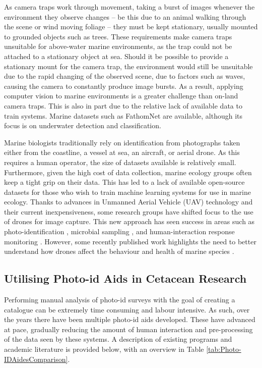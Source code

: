 As camera traps work through movement, taking a burst of images whenever the environment they observe changes -- be this due to an animal walking through the scene or wind moving foliage -- they must be kept stationary, usually mounted to grounded objects such as trees. These requirements make camera traps unsuitable for above-water marine environments, as the trap could not be attached to a stationary object at sea. Should it be possible to provide a stationary mount for the camera trap, the environment would still be unsuitable due to the rapid changing of the observed scene, due to factors such as waves, causing the camera to constantly produce image bursts. As a result, applying computer vision to marine environments is a greater challenge than on-land camera traps. This is also in part due to the relative lack of available data to train systems. Marine datasets such as FathomNet \cite{katija_fathomnet_2022} are available, although its focus is on underwater detection and classification.

Marine biologists traditionally rely on identification from photographs taken either from the coastline, a vessel at sea, an aircraft, or aerial drone. As this requires a human operator, the size of datasets available is relatively small. Furthermore, given the high cost of data collection, marine ecology groups often keep a tight grip on their data. This has led to a lack of available open-source datasets for those who wish to train machine learning systems for use in marine ecology. Thanks to advances in Unmanned Aerial Vehicle (UAV) technology and their current inexpensiveness, some research groups have shifted focus to the use of drones for image capture. This new approach has seen success in areas such as photo-identification \cite{bogucki_applying_2019, gray_drones_2019}, microbial sampling \cite{centelleghe_use_2020}, and human-interaction response monitoring \cite{fiori_using_2020}. However, some recently published work highlights the need to better understand how drones affect the behaviour and health of marine species \cite{giles_responses_2020, bevan_measuring_2018, ramos_bottlenose_2018, pomeroy_assessing_2015}. 

\subsection{Utilising Photo-id Aids in Cetacean Research}\label{ch:Background,sec:conTech,sub:photoIDAides}

Performing manual analysis of photo-id surveys with the goal of creating a catalogue can be extremely time consuming and labour intensive. As such, over the years there have been multiple photo-id aids developed. These have advanced at pace, gradually reducing the amount of human interaction and pre-processing of the data seen by these systems. A description of existing programs and academic literature is provided below, with an overview in Table \ref{tab:Photo-IDAidesComparison}.

